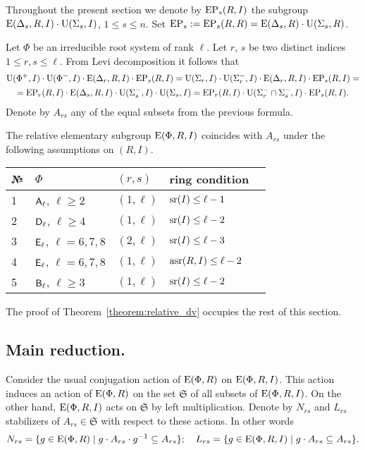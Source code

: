 Throughout the present section we denote by $\operatorname{EP}_s(R, I)$ the subgroup $\operatorname{E}(\Delta_s, R, I) \cdot \operatorname{U}(\Sigma_s, I)$, $1 \leq s \leq n$.
Set $\operatorname{EP}_s := \operatorname{EP}_s(R, R) = \operatorname{E}(\Delta_s, R) \cdot \operatorname{U}(\Sigma_s, R)$. 

Let $\Phi$ be an irreducible root system of rank $\ell$.
Let $r$, $s$ be two distinct indices $1\leq r,s \leq \ell$.
From Levi decomposition it follows that
\begin{multline}\nonumber \operatorname{U}(\Phi^+, I)\cdot \operatorname{U}(\Phi^-, I) \cdot \operatorname{E}(\Delta_r, R, I) \cdot \operatorname{EP}_s(R, I) = 
\operatorname{U}(\Sigma_r, I)\cdot \operatorname{U}(\Sigma^-_r, I) \cdot \operatorname{E}(\Delta_r, R, I) \cdot \operatorname{EP}_s(R, I) = \\
= \operatorname{EP}_r(R, I) \cdot \operatorname{E}(\Delta_s, R, I) \cdot \operatorname{U}(\Sigma_s^-, I)\cdot \operatorname{U}(\Sigma_s, I) = 
\operatorname{EP}_r(R, I) \cdot \operatorname{U}(\Sigma^-_r\cap \Sigma^-_s, I) \cdot \operatorname{EP}_s(R, I). \end{multline}
Denote by $A_{rs}$ any of the equal subsets from the previous formula. 

\begin{thm}\label{theorem:relative_dv}
The relative elementary subgroup $\operatorname{E}(\Phi, R, I)$ coincides with $A_{rs}$ under the following assumptions on $(R, I)$.
  \begin{center}
    \begin{tabular}{| l | l | l | l | l |} \hline
    № & $\Phi$ & $(r,s)$ & ring condition \\ \hline
    1 & $\mathsf{A}_\ell$, $\ell\geq 2$ & $(1, \ell)$ & $\operatorname{sr}(I) \leq \ell-1$ \\ \hline
    2 & $\mathsf{D}_\ell$, $\ell\geq 4$ & $(1, \ell)$ & $\operatorname{sr}(I) \leq \ell-2$ \\ \hline    
    3 & $\mathsf{E}_\ell$, $\ell=6,7,8$ & $(2, \ell)$ & $\operatorname{sr}(I) \leq \ell-3$ \\ \hline     
    4 & $\mathsf{E}_\ell$, $\ell=6,7,8$ & $(1, \ell)$ & $\operatorname{asr}(R, I)\leq \ell-2$ \\ \hline    
    5 & $\mathsf{B}_\ell$, $\ell\geq 3$ & $(1, \ell)$ & $\operatorname{sr}(I) \leq \ell-2$ \\ \hline
    \end{tabular} \end{center} 
\end{thm}
The proof of Theorem~\ref{theorem:relative_dv} occupies the rest of this section.

\subsection{Main reduction.} Consider the usual conjugation action of $\operatorname{E}(\Phi, R)$ on $\operatorname{E}(\Phi, R, I)$. 
This action induces an action of $\operatorname{E}(\Phi, R)$ on the set $\mathfrak{S}$ of all subsets of $\operatorname{E}(\Phi, R, I)$.
On the other hand, $\operatorname{E}(\Phi, R, I)$ acts on $\mathfrak{S}$ by left multiplication.
Denote by $N_{rs}$ and $L_{rs}$ stabilizers of $A_{rs} \in \mathfrak{S}$ with respect to these actions.
In other words $$N_{rs} = \{ g\in \operatorname{E}(\Phi, R) \mid g \cdot A_{rs} \cdot g^{-1} \subseteq A_{rs} \};\quad L_{rs}= \{ g\in \operatorname{E}(\Phi, R, I) \mid g \cdot A_{rs} \subseteq A_{rs} \}.$$

